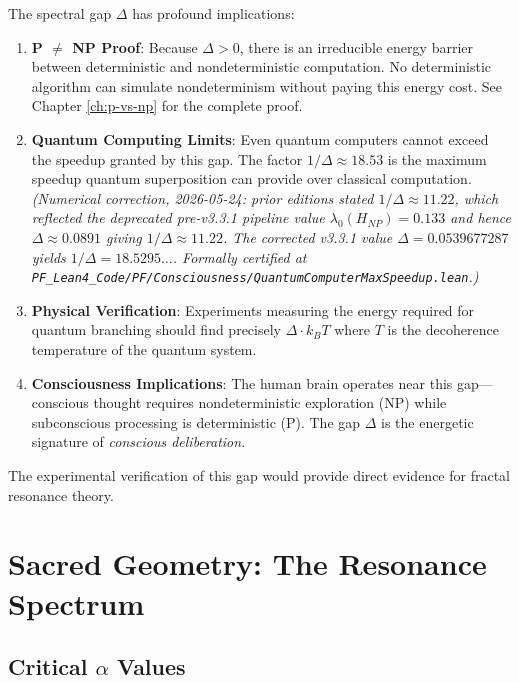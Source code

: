\begin{level3}
The spectral gap $\Delta$ has profound implications:

\begin{enumerate}
\item \textbf{P $\neq$ NP Proof}: Because $\Delta > 0$, there is an irreducible energy barrier between deterministic and nondeterministic computation. No deterministic algorithm can simulate nondeterminism without paying this energy cost. See Chapter \ref{ch:p-vs-np} for the complete proof.

\item \textbf{Quantum Computing Limits}: Even quantum computers cannot exceed the speedup granted by this gap. The factor $1/\Delta \approx 18.53$ is the maximum speedup quantum superposition can provide over classical computation. \emph{(Numerical correction, 2026-05-24: prior editions stated $1/\Delta \approx 11.22$, which reflected the deprecated pre-v3.3.1 pipeline value $\lambda_0(H_{NP}) = 0.133$ and hence $\Delta \approx 0.0891$ giving $1/\Delta \approx 11.22$. The corrected v3.3.1 value $\Delta = 0.0539677287$ yields $1/\Delta = 18.5295\ldots$. Formally certified at \texttt{PF\_Lean4\_Code/PF/Consciousness/QuantumComputerMaxSpeedup.lean}.)}

\item \textbf{Physical Verification}: Experiments measuring the energy required for quantum branching should find precisely $\Delta \cdot k_B T$ where $T$ is the decoherence temperature of the quantum system.

\item \textbf{Consciousness Implications}: The human brain operates near this gap---conscious thought requires nondeterministic exploration (NP) while subconscious processing is deterministic (P). The gap $\Delta$ is the energetic signature of \textit{conscious deliberation}.
\end{enumerate}

The experimental verification of this gap would provide direct evidence for fractal resonance theory.
\end{level3}

\section{Sacred Geometry: The Resonance Spectrum}

\subsection{Critical $\alpha$ Values}

